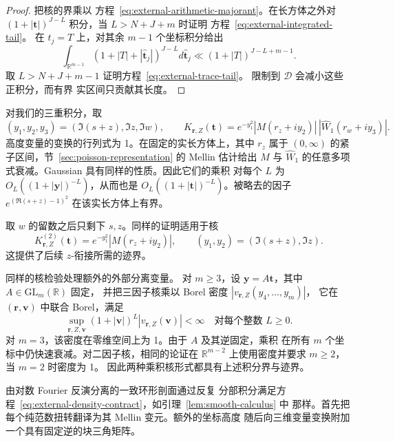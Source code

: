 \documentclass[11pt,a4paper]{article}
\numberwithin{equation}{section}
\numberwithin{figure}{section}
\theoremstyle{definition}
\theoremstyle{remark}
\begin{document}
\begin{proof}
把核的界乘以
方程~\eqref{eq:external-arithmetic-majorant}。在长方体之外对
$(1+|\boldsymbol t|)^{J-L}$ 积分，当 $L>N+J+m$ 时证明
方程~\eqref{eq:external-integrated-tail}。
在 $t_j=T$ 上，对其余 $m-1$ 个坐标积分给出
\[
 \int_{\mathbb R^{m-1}}
 (1+|T|+|\widehat{\boldsymbol t}_j|)^{J-L}
 d\widehat{\boldsymbol t}_j
 \ll(1+|T|)^{J-L+m-1}.
\]
取 $L>N+J+m-1$ 证明方程~\eqref{eq:external-trace-tail}。
限制到 $\mathcal D$ 会减小这些正积分，而有界
实区间只贡献其长度。
\end{proof}

对我们的三重积分，取
\[
 (y_1,y_2,y_3)=(\Im(s+z),\Im z,\Im w),\qquad
 K_{\boldsymbol r,Z}(\boldsymbol t)
 =e^{-y_1^2}|M(r_z+iy_2)|\,|\widehat W_1(r_w+iy_3)|.
\]
高度变量的变换的行列式为 1。在固定的实长方体上，其中 $r_z$ 属于
$(0,\infty)$ 的紧子区间，节~\ref{sec:poisson-representation} 的 Mellin 估计给出 $M$ 与
$\widehat W_1$ 的任意多项式衰减。Gaussian 具有同样的性质。因此它们的乘积
对每个 $L$ 为 $O_L((1+|\boldsymbol y|)^{-L})$，从而也是
$O_L((1+|\boldsymbol t|)^{-L})$。被略去的因子
$e^{(\Re(s+z)-1)^2}$ 在该实长方体上有界。

取 $w$ 的留数之后只剩下 $s,z$。同样的证明适用于核
\begin{equation}
 K^{(2)}_{\boldsymbol r,Z}(\boldsymbol t)
 =e^{-y_1^2}|M(r_z+iy_2)|,
 \qquad(y_1,y_2)=(\Im(s+z),\Im z).
 \label{eq:external-two-dimensional-kernel}
\end{equation}
这提供了后续 $z$-衔接所需的迹界。

同样的核检验处理额外的外部分离变量。
对 $m\ge3$，设 $\boldsymbol y=A\boldsymbol t$，其中 $A\in\mathrm{GL}_m(\mathbb R)$ 固定，
并把三因子核乘以 Borel 密度 $|v_{\boldsymbol r,Z}(y_4,\ldots,y_m)|$，
它在 $(\boldsymbol r,\boldsymbol v)$ 中联合 Borel，满足
\begin{equation}
 \sup_{\boldsymbol r,Z,\boldsymbol v}
 (1+|\boldsymbol v|)^L|v_{\boldsymbol r,Z}(\boldsymbol v)|<\infty
 \quad\text{对每个整数 }L\ge0.
 \label{eq:external-density-contract}
\end{equation}
对 $m=3$，该密度在零维空间上为 1。由于 $A$ 及其逆固定，乘积
在所有 $m$ 个坐标中仍快速衰减。对二因子核，相同的论证在
$\mathbb R^{m-2}$ 上使用密度并要求 $m\ge2$，当 $m=2$ 时密度为 1。
因此两种乘积核形式都具有上述积分界与迹界。

由对数 Fourier 反演分离的一致环形剖面通过反复
分部积分满足方程~\eqref{eq:external-density-contract}，如引理~\ref{lem:smooth-calculus} 中
那样。首先把每个纯范数扭转翻译为其 Mellin 变元。额外的坐标高度
随后向三维变量变换附加一个具有固定逆的块三角矩阵。
\end{document}
